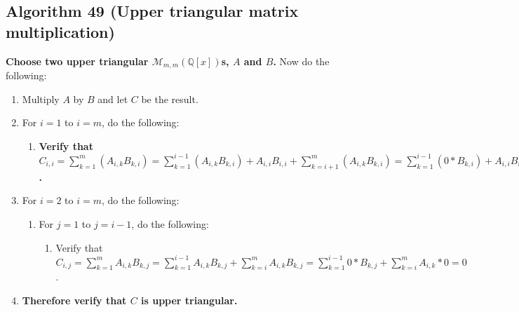 \documentclass[twocolumn]{article}
\begin{document}
		\subsection{Algorithm 49 (Upper triangular matrix multiplication)}\label{sec:algorithm 49}
			\textbf{Choose two upper triangular $\mathcal{M}_{m,m}(\mathbb{Q}[x])$s, $A$ and $B$.} Now do the following:
			\begin{enumerate}
				\item Multiply $A$ by $B$ and let $C$ be the result.
				\item For $i=1$ to $i=m$, do the following:
				\begin{enumerate}
					\item \textbf{Verify that $C_{i,i}=\sum_{k=1}^m (A_{i,k}B_{k,i})=\sum_{k=1}^{i-1} (A_{i,k}B_{k,i})+A_{i,i}B_{i,i}+\sum_{k=i+1}^m (A_{i,k}B_{k,i})=\sum_{k=1}^{i-1} (0*B_{k,i})+A_{i,i}B_{i,i}+\sum_{k=i+1}^m (A_{i,k}*0)=A_{i,i}B_{i,i}$.}
				\end{enumerate}
				\item For $i=2$ to $i=m$, do the following:
				\begin{enumerate}
					\item For $j=1$ to $j=i-1$, do the following:
					\begin{enumerate}
						\item Verify that $C_{i,j}=\sum_{k=1}^m A_{i,k}B_{k,j}=\sum_{k=1}^{i-1} A_{i,k}B_{k,j}+\sum_{k=i}^m A_{i,k}B_{k,j}=\sum_{k=1}^{i-1} 0*B_{k,j}+\sum_{k=i}^m A_{i,k}*0=0$.
					\end{enumerate}
				\end{enumerate}
				\item \textbf{Therefore verify that $C$ is upper triangular.}
			\end{enumerate}
\end{document}
